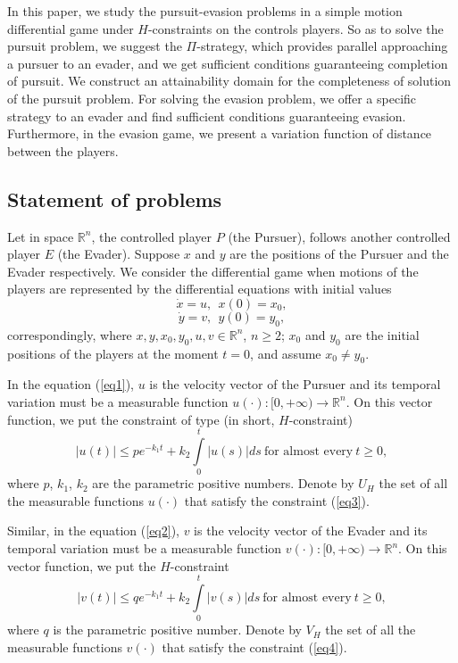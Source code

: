 \documentclass[10 pt]{book}
\begin{document}
In this paper, we study the pursuit-evasion problems in a simple motion differential game under $H$-constraints on the controls players. So as to solve the pursuit problem, we suggest the $\Pi$-strategy, which provides parallel approaching a pursuer to an evader, and we get   sufficient conditions guaranteeing completion of pursuit. We construct an attainability domain for the completeness of solution of the pursuit problem. For solving the evasion problem, we offer a specific strategy to an evader and find sufficient conditions guaranteeing evasion. Furthermore, in the evasion game, we present a variation function of distance between the players.

\subsection*{Statement of problems}

Let in space $\mathbb R^n$, the controlled player $P$ (the Pursuer), follows another controlled player $E$ (the Evader). Suppose $x$ and $y$ are the positions of the Pursuer and the Evader respectively. We consider the differential game when motions of the players are represented by the differential equations with initial values
\begin{equation}\label{eq1}
\dot{x}=u, \ \ x(0)=x_0,
\end{equation}
\begin{equation}\label{eq2}
\dot{y}=v, \ \ y(0)=y_0,
\end{equation}
correspondingly, where $x, y, x_0, y_0, u, v \in \mathbb{R}^n$, $n \ge 2$; $x_0$ and $y_0$ are the initial positions of the players at the moment $t=0$, and assume $x_0\neq y_0$.

In the equation (\ref{eq1}), $u$ is the velocity vector of the Pursuer and its temporal variation must be a measurable function
 $u(\cdot):[0,+\infty)\rightarrow \mathbb R^n$. On this vector function, we put the constraint of type (in short, $H$-constraint)
\begin{equation}\label{eq3}
|u(t)| \le p e^{-k_{1}t}+k_{2} \int\limits_{0}^{t}|u(s)|ds \ \mbox{for almost every} \ t\ge 0,
\end{equation}
where $p$, $k_{1}$, $k_{2}$ are the parametric positive numbers. Denote by $U_{H}$ the set of all the measurable functions $u(\cdot)$ that satisfy the constraint (\ref{eq3}).

Similar, in the equation (\ref{eq2}), $v$ is the velocity vector of the Evader and its temporal variation must
 be a measurable function $v(\cdot):[0,+\infty)\rightarrow \mathbb R^n$. On this vector function, we put the $H$-constraint
\begin{equation}\label{eq4}
|v(t)| \le q e^{-k_{1}t}+ k_{2}\int\limits_{0}^{t}|v(s)|ds \ \mbox{for almost every} \
t\ge 0,
\end{equation}
where $q$ is the parametric positive number. Denote by $V_{H}$ the set of all the measurable functions $v(\cdot)$ that satisfy the constraint (\ref{eq4}).
\end{document}

